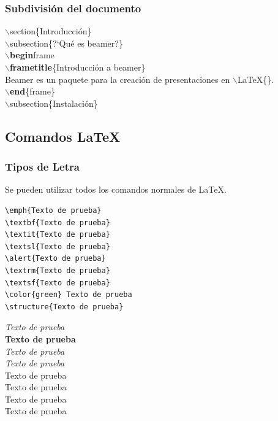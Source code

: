 \documentclass[aspectratio=1610]{beamer}%
\newcommand\azul[1]{\textcolor[RGB]{19,15,204}{#1}}
\begin{document}
\begin{frame}[fragile]
\frametitle{\textbf{Subdivisión del documento}}
\justifying
 \begin{block}{}
$\backslash$\azul{section}\{Introducci\'on\}\\
$\backslash$\azul{subsection}\{?`Qu\'e es beamer?\}\\
$\backslash$\textbf{begin}{frame}\\
$\backslash$\textbf{frametitle}\{Introducci\'on a beamer\}\\
Beamer es un paquete para la creaci\'on de presentaciones en $\backslash$LaTeX\{\}.\\
$\backslash$\textbf{end}\{frame\}\\
$\backslash$\azul{subsection}\{Instalaci\'on\}
\end{block}

\end{frame}

\subsection{Comandos \LaTeX{}}
\begin{frame}[fragile]
\frametitle{\textbf{Tipos de Letra}}
\justifying
 Se pueden utilizar todos los comandos normales de \LaTeX{}.
 
 \begin{minipage}[l]{0.60\linewidth}
   \lstset{language=}%
   \vspace{-0.7cm}
\begin{lstlisting}
\emph{Texto de prueba}
\textbf{Texto de prueba}
\textit{Texto de prueba}
\textsl{Texto de prueba}
\alert{Texto de prueba}
\textrm{Texto de prueba}
\textsf{Texto de prueba}
\color{green} Texto de prueba
\structure{Texto de prueba}
\end{lstlisting}\vspace{-0.3cm}

\end{minipage}\hfill
\begin{minipage}[r]{0.38\linewidth}
\emph{Texto de prueba}\\
\textbf{Texto de prueba}\\
\textit{Texto de prueba}\\
\textsl{Texto de prueba}\\
\alert{Texto de prueba}\\
\textrm{Texto de prueba}\\
\textsf{Texto de prueba}\\
\color{green} Texto de prueba\\
\end{minipage}

 
\end{frame}
\end{document}
